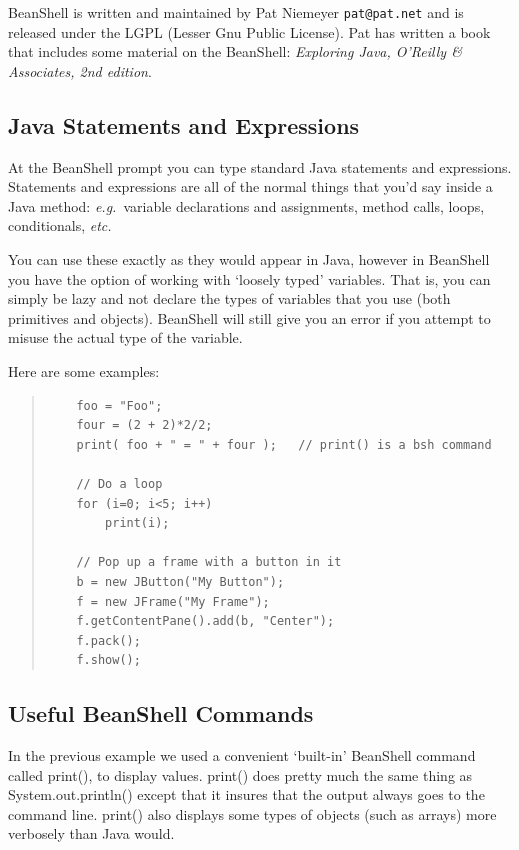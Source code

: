 \documentclass[twoside,11pt]{article}
\newcommand{\htmladdnormallink}[2]{#1}
\renewcommand{\_}{\texttt{\symbol{95}}}
\newcommand{\eg}{\textit{e.g.}}
\newcommand{\etc}{\textit{etc.}}
\begin{document}
BeanShell is written and maintained by Pat Niemeyer
\htmladdnormallink{\texttt{pat@pat.net}}{mailto:pat@pat.net} and is
released under the LGPL (Lesser Gnu Public License). Pat has written a
book that includes some material on the BeanShell: \textit{Exploring
Java, O'Reilly \& Associates, 2nd edition}.

\subsection{Java Statements and Expressions}

At the BeanShell prompt you can type standard Java statements and
expressions.  Statements and expressions are all of the normal things
that you'd say inside a Java method: \eg\ variable declarations and
assignments, method calls, loops, conditionals, \etc

You can use these exactly as they would appear in Java, however in
BeanShell you have the option of working with `loosely typed'
variables.  That is, you can simply be lazy and not declare the types
of variables that you use (both primitives and objects).  BeanShell
will still give you an error if you attempt to misuse the actual type
of the variable.

Here are some examples:
\begin{quote}
\begin{verbatim}
    foo = "Foo";
    four = (2 + 2)*2/2;
    print( foo + " = " + four );   // print() is a bsh command

    // Do a loop
    for (i=0; i<5; i++)
        print(i);

    // Pop up a frame with a button in it
    b = new JButton("My Button");
    f = new JFrame("My Frame");
    f.getContentPane().add(b, "Center");
    f.pack();
    f.show();
\end{verbatim}
\end{quote}

\subsection{Useful BeanShell Commands}

In the previous example we used a convenient `built-in' BeanShell
command called print(), to display values.  print() does pretty much
the same thing as System.out.println() except that it insures that the
output always goes to the command line.  print() also displays some
types of objects (such as arrays) more verbosely than Java would.
\end{document}
